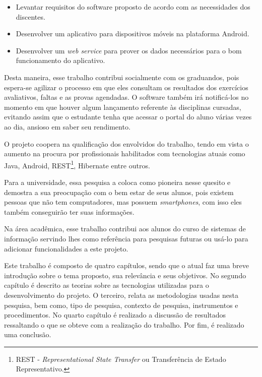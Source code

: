 	\begin{itemize}
	  
	  \item Levantar requisitos do software proposto de acordo com as
	  necessidades dos discentes.
	  
	  \item Desenvolver um aplicativo para dispositivos móveis na plataforma
	  Android.
	  
	  \item Desenvolver um \textit{web service} para prover os dados necessários
	  para o bom funcionamento do aplicativo.
	
	\end{itemize}
	
	\par Desta maneira, esse trabalho contribui socialmente com os graduandos, pois
espera-se agilizar o processo em que eles consultam os resultados dos
exercícios avaliativos, faltas e as provas agendadas. O software também irá
notificá-los no momento em que houver algum lançamento referente às disciplinas
cursadas, evitando assim que o estudante tenha que acessar o portal do aluno
várias vezes ao dia, ansioso em saber seu rendimento.

	\par O projeto coopera na qualificação dos envolvidos do trabalho, tendo em
vista o aumento na procura por profissionais habilitados com tecnologias atuais
como Java, Android, REST\footnote{REST - \textit{Representational State
Transfer} ou Transferência de Estado Representativo.}, Hibernate entre outros.

	\par Para a universidade, essa pesquisa a coloca como pioneira nesse quesito e
demostra a sua preocupação com o bem estar de seus alunos, pois existem pessoas
que não tem computadores, mas possuem \textit{smartphones}, com isso eles
também conseguirão ter suas informações.

	\par Na área acadêmica, esse trabalho contribui aos alunos do curso de sistemas
de informação servindo lhes como referência para pesquisas futuras ou usá-lo
para adicionar funcionalidades a este projeto.

	\par Este trabalho é composto de quatro capítulos, sendo que o atual faz uma
breve introdução sobre o tema proposto, sua relevância e seus objetivos. No
segundo capítulo é descrito as teorias sobre as tecnologias utilizadas para o
desenvolvimento do projeto. O terceiro, relata as metodologias usadas nesta
pesquisa, bem como, tipo de pesquisa, contexto de pesquisa, instrumentos e
procedimentos. No quarto capítulo é realizado a discussão de resultados
ressaltando o que se obteve com a realização do trabalho. Por fim, é realizado
uma conclusão.
